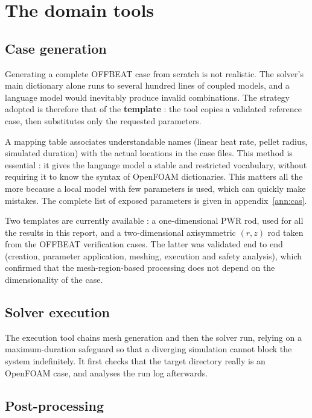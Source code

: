 \documentclass[12pt,a4paper]{report}
\begin{document}
\section{The domain tools}

\subsection{Case generation}

Generating a complete OFFBEAT case from scratch is not realistic. The solver's
main dictionary alone runs to several hundred lines of coupled models, and a
language model would inevitably produce invalid combinations. The strategy
adopted is therefore that of the \textbf{template} : the tool copies a validated
reference case, then substitutes only the requested parameters.

A mapping table associates understandable names (linear heat rate, pellet
radius, simulated duration) with the actual locations in the case files. This
method is essential : it gives the language model a stable and restricted
vocabulary, without requiring it to know the syntax of OpenFOAM dictionaries.
This matters all the more because a local model with few parameters is used,
which can quickly make mistakes. The complete list of exposed parameters is
given in appendix~\ref{ann:cas}.

Two templates are currently available : a one-dimensional PWR rod, used for all
the results in this report, and a two-dimensional axisymmetric $(r,z)$ rod taken
from the OFFBEAT verification cases. The latter was validated end to end
(creation, parameter application, meshing, execution and safety analysis), which
confirmed that the mesh-region-based processing does not depend on the
dimensionality of the case.

\subsection{Solver execution}

The execution tool chains mesh generation and then the solver run, relying on a
maximum-duration safeguard so that a diverging simulation cannot block the
system indefinitely. It first checks that the target directory really is an
OpenFOAM case, and analyses the run log afterwards.

\subsection{Post-processing}
\end{document}
